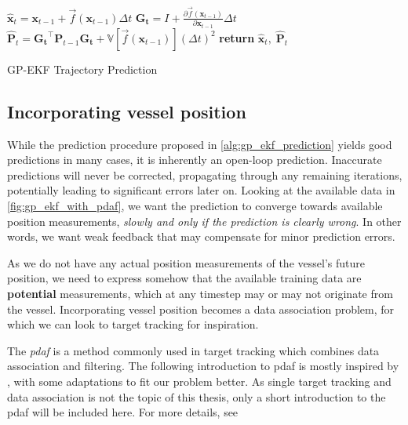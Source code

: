 \begin{algorithm}[h]
    \begin{algorithmic}[1]
        \State $\hat{\boldsymbol{x}}_{t} = \boldsymbol{x}_{t-1} + \vec{f}(\boldsymbol{x}_{t-1}) \Delta t$
        \State $\boldsymbol{G_t} = I + \frac{\partial \vec{f}(\boldsymbol{x}_{t-1})}{\partial \boldsymbol{x}_{t-1}} \Delta t$
        \State $\hat{\boldsymbol{P}}_t = \boldsymbol{G_t}^\intercal \boldsymbol{P}_{t-1} \boldsymbol{G_t} +\mathbb{V}[\vec{f}(\boldsymbol{x}_{t-1})] (\Delta t)^2$
        \State \textbf{return} $\hat{\boldsymbol{x}}_t, \; \hat{\boldsymbol{P}}_t$
        \EndProcedure
    \end{algorithmic}
    \caption{GP-EKF Trajectory Prediction}
    \label{alg:gp_ekf_prediction}
\end{algorithm}

\subsection{Incorporating vessel position}
While the prediction procedure proposed in \cref{alg:gp_ekf_prediction} yields good predictions in many cases, it is inherently an open-loop prediction. Inaccurate predictions will never be corrected, propagating through any remaining iterations, potentially leading to significant errors later on. Looking at the available data in \cref{fig:gp_ekf_with_pdaf}, we want the prediction to converge towards available position measurements, \textit{slowly and only if the prediction is clearly wrong}. In other words, we want weak feedback that may compensate for minor prediction errors. 

As we do not have any actual position measurements of the vessel's future position, we need to express somehow that the available training data are \textbf{potential} measurements, which at any timestep may or may not originate from the vessel. Incorporating vessel position becomes a data association problem, for which we can look to target tracking for inspiration.

The \textit{\acrfull{pdaf}} is a method commonly used in target tracking which combines data association and filtering. The following introduction to \acrshort{pdaf} is mostly inspired by \cite{sensorfusjon}, with some adaptations to fit our problem better. As single target tracking and data association is not the topic of this thesis, only a short introduction to the \acrshort{pdaf} will be included here. For more details, see \cite{sensorfusjon,bar1995multitarget}

